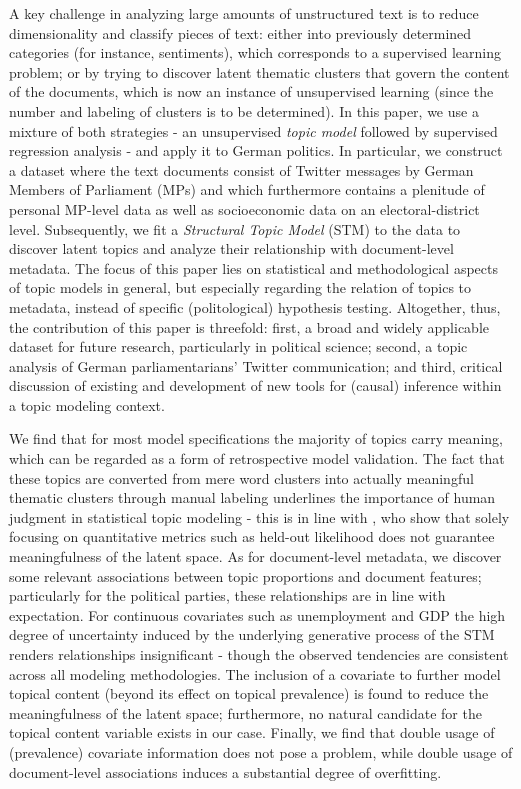 A key challenge in analyzing large amounts of unstructured text is to reduce dimensionality and classify pieces of text: either into previously determined categories (for instance, sentiments), which corresponds to a supervised learning problem; or by trying to discover latent thematic clusters that govern the content of the documents, which is now an instance of unsupervised learning (since the number and labeling of clusters is to be determined). In this paper, we use a mixture of both strategies - an unsupervised \textit{topic model} followed by supervised regression analysis - and apply it to German politics. In particular, we construct a dataset where the text documents consist of Twitter messages by German Members of Parliament (MPs) and which furthermore contains a plenitude of personal MP-level data as well as socioeconomic data on an electoral-district level. Subsequently, we fit a \textit{Structural Topic Model} (STM) to the data to discover latent topics and analyze their relationship with document-level metadata. The focus of this paper lies on statistical and methodological aspects of topic models in general, but especially regarding the relation of topics to metadata, instead of specific (politological) hypothesis testing. Altogether, thus, the contribution of this paper is threefold: first, a broad and widely applicable dataset for future research, particularly in political science; second, a topic analysis of German parliamentarians' Twitter communication; and third, critical discussion of existing and development of new tools for (causal) inference within a topic modeling context.

We find that for most model specifications the majority of topics carry meaning, which can be regarded as a form of retrospective model validation. The fact that these topics are converted from mere word clusters into actually meaningful thematic clusters through manual labeling underlines the importance of human judgment in statistical topic modeling - this is in line with \cite{chang2009reading}, who show that solely focusing on quantitative metrics such as held-out likelihood does not guarantee meaningfulness of the latent space. As for document-level metadata, we discover some relevant associations between topic proportions and document features; particularly for the political parties, these relationships are in line with expectation. For continuous covariates such as unemployment and GDP the high degree of uncertainty induced by the underlying generative process of the STM renders relationships insignificant - though the observed tendencies are consistent across all modeling methodologies. The inclusion of a covariate to further model topical content (beyond its effect on topical prevalence) is found to reduce the meaningfulness of the latent space; furthermore, no natural candidate for the topical content variable exists in our case. Finally, we find that double usage of (prevalence) covariate information does not pose a problem, while double usage of document-level associations induces a substantial degree of overfitting.


